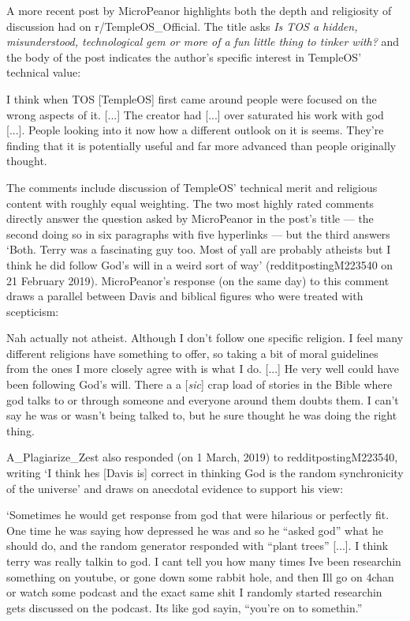 \documentclass[Draft.tex]{subfiles}
\begin{document}
A more recent post by MicroPeanor \parencite*{MicroPeanor19} highlights
both the depth and religiosity of discussion had on r/TempleOS\_Official.
The title asks
\textit{Is TOS a hidden, misunderstood, technological gem
or more of a fun little thing to tinker with?}
and the body of the post indicates the author's specific interest in
TempleOS' technical value:
\begin{displayquote}
	I think when TOS [TempleOS] first came around people were focused
	on the wrong aspects of it.  [...]
	The creator had [...] over saturated his work with god [...].
	People looking into it now how a different outlook on it is seems.
	They’re finding that it is potentially useful and far more advanced
	than people originally thought.
\end{displayquote}
The comments include discussion of TempleOS' technical merit and religious
content with roughly equal weighting.
The two most highly rated comments directly answer the question asked by
MicroPeanor in the post's title --- the second doing so in six paragraphs
with five hyperlinks --- but the third answers
`Both. Terry was a fascinating guy too.
Most of yall are probably atheists but I think
he did follow God's will in a weird sort of way'
(redditpostingM223540 on 21 February 2019).
MicroPeanor's response (on the same day) to this comment
draws a parallel between
Davis and biblical figures who were treated with scepticism:
\begin{displayquote}
	Nah actually not atheist. Although I don’t follow one specific religion.
	I feel many different religions have something to offer,
	so taking a bit of moral guidelines from the ones I more closely agree with
	is what I do.  [...]
	He very well could have been following God’s will.
	There a a [\textit{sic}] crap load of stories in the Bible
	where god talks to or through someone and everyone around them doubts them.
	I can’t say he was or wasn’t being talked to,
	but he sure thought he was doing the right thing.
\end{displayquote}
A\_Plagiarize\_Zest also responded (on 1 March, 2019) to redditpostingM223540,
writing `I think hes [Davis is] correct in thinking God
is the random synchronicity of the universe' and draws on anecdotal evidence
to support his view:
\begin{displayquote}
	`Sometimes he would get response from god that were hilarious or perfectly fit.
	One time he was saying how depressed he was and so he ``asked god''
	what he should do, and the random generator responded
	with ``plant trees'' [...].
	I think terry was really talkin to god. I cant tell you how many times
	Ive been researchin something on youtube, or gone down some rabbit hole,
	and then Ill go on 4chan or watch some podcast and the exact same shit
	I randomly started researchin gets discussed on the podcast.
	Its like god sayin, ``you're on to somethin.''
\end{displayquote}
\end{document}
